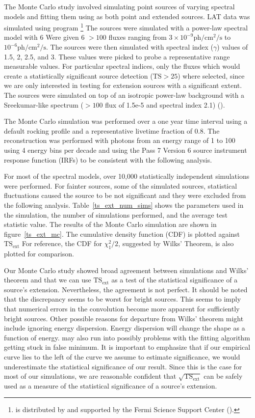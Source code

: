 \documentclass[12pt,preprint]{aastex}
\newcommand{\mev}{\text{MeV}\xspace}
\newcommand{\gev}{\text{GeV}\xspace}
\newcommand{\ph}{\text{ph}\xspace}
\newcommand{\cm}{\text{cm}\xspace}
\renewcommand{\sec}{\text{s}\xspace}
\newcommand{\tsext}{{\ensuremath{\text{TS}_\text{ext}}}\xspace}
\newcommand{\ts}{\text{TS}\xspace}
\newcommand{\pointlike}{\text{\em pointlike}\xspace}
\newcommand{\gtobssim}{\text{\em gtobssim}\xspace}
\begin{document}
The Monte Carlo study involved simulating point sources of varying
spectral models and fitting them using \pointlike as both point
and extended sources.  LAT data was simulated using program
\gtobssim\footnote{\gtobssim is distributed by and supported by the
Fermi Science Support Center (\cite{fssc}).}  The sources were simulated
with a power-law spectral model with 6 Were given 6 $>100$ \mev fluxes
ranging from $3\times 10^{-9} \ph/\cm^2/\sec$ to $10^{-6} \ph/\cm^2/\sec$.
The sources were then simulated with spectral index ($\gamma$) values of
1.5, 2, 2.5, and 3.  These values were picked to probe a representative
range measurable values.  For particular spectral indices, only the fluxes
which would create a statistically significant source detection ($\ts>25$)
where selected, since we are only interested in testing for extension
sources with a significant extent. The sources were simulated on top of
an isotropic power-law background with a Sreekumar-like spectrum ($>100$
\mev flux of 1.5e-5 and spectral index 2.1) (\cite{sreekumar_isotropic}).

The Monte Carlo simulation was performed over a one year time interval
using a default rocking profile and a representative livetime fraction
of 0.8.  The reconstruction was performed with photons from an energy
range of 1 \gev to 100 \gev using 4 energy bins per decade and using
the Pass 7 Version 6 source instrument response function (IRFs) to be
consistent with the following analysis.

For most of the spectral models, over 10,000 statistically independent
simulations were performed.  For fainter sources, some of the
simulated sources, statistical fluctuations caused the source
to be not significant and they were excluded from the following
analysis.  Table~\ref{ts_ext_num_sims} shows the parameters used in
the simulation, the number of simulations performed, and the average
test statistic value.  The results of the Monte Carlo simulation are
shown in figure~\ref{ts_ext_mc}.  The cumulative density function (CDF)
is plotted against $\tsext$ For reference, the CDF for $\chi^2_1/2$,
suggested by Wilks' Theorem, is also plotted for comparison.

Our Monte Carlo study showed broad agreement between simulations and
Wilks' theorem and that we can use \tsext as a test of the statistical
significance of a source's extension.  Nevertheless, the agreement
is not perfect.  It should be noted that the discrepancy seems to be
worst for bright sources. This seems to imply that numerical errors in
the convolution become more apparent for sufficiently bright sources.
Other possible reasons for departure from Wilks' theorem might include
\pointlike ignoring energy dispersion. Energy dispersion will change
the shape as a function of energy. \pointlike may also run into possibly
problems with the fitting algorithm getting stuck in false minimum. It
is important to emphasize that if our empirical curve lies to the left of
the curve we assume to estimate significance, we would underestimate the
statistical significance of our result. Since this is the case for most
of our simulations, we are reasonable confident that $\sqrt{\tsext}$
can be safely used as a measure of the statistical significance of a
source's extension.
\end{document}
